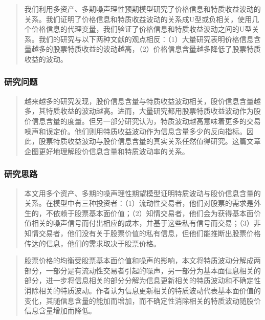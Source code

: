 \documentclass[
]{article}
\begin{document}
\begin{quote}
我们利用多资产、多期噪声理性预期模型研究了价格信息和特质收益波动的关系。我们证明了价格信息和特质收益波动的关系成U型或负相关，使用几个价格信息的代理变量，我们验证了价格信息和特质收益波动之间的U型关系。我们的研究与以下两种文献的观点相反：（1）大量研究表明价格信息含量越多的股票特质收益的波动越高，（2）价格信息含量越多降低了股票特质收益的波动。
\end{quote}

\hypertarget{ux7814ux7a76ux95eeux9898-3}{%
\subsubsection{研究问题}\label{ux7814ux7a76ux95eeux9898-3}}

\begin{quote}
越来越多的研究发现，股价信息含量与特质收益波动相关，股价信息含量越多，其特质收益的波动越高。进而，大量研究都用股票特质收益波动作为股价信息含量的度量。但另一部分研究认为，特质波动越高意味着更多的交易噪声和误定价。他们则用特质收益波动作为信息含量多少的反向指标。因此，股票特质收益波动与股价信息含量的真实关系任然值得研究。这篇文章企图更好地理解股价信息含量和特质波动率的关系。
\end{quote}

\hypertarget{ux7814ux7a76ux601dux8def}{%
\subsubsection{研究思路}\label{ux7814ux7a76ux601dux8def}}

\begin{quote}
本文用多个资产、多期的噪声理性期望模型证明特质波动与股价信息含量的关系。在模型中有三种投资者：（1）流动性交易者，他们对股票的需求是外生的，不依赖于股票基本面价值；（2）知情交易者，他们会为获得基本面价值相关的噪声信号而付出相应的成本，并基于这些私有信号而交易；（3）非知情交易者，他们没有关于股票价值的私有信息，但他们能推断出股票价格传达的信息，他们的需求取决于股票价格。
\end{quote}

\begin{quote}
股票价格的均衡受股票基本面价值和噪声的影响，本文将特质波动分解成两部分，一部分是有流动性交易者引起的噪声，另一部分为基本面信息相关的部分，进一步将信息相关的部分分解为信息更新相关的特质波动和不确定性消除相关的特质波动。作者认为信息更新相关的特质波动代表基本面价值的变化，其随信息含量的能加而增加，而不确定性消除相关的特质波动随股价信息含量增加而降低。
\end{quote}
\end{document}

